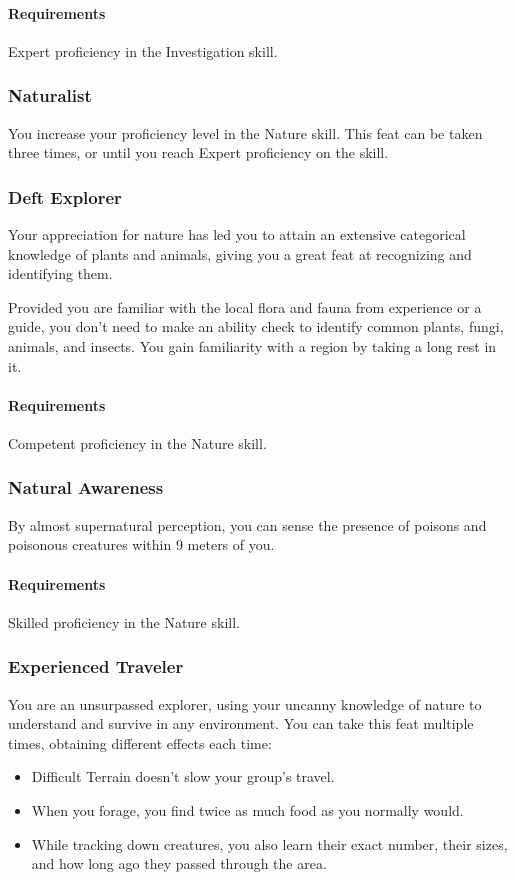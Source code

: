     \paragraph{Requirements} Expert proficiency in the Investigation skill.
\subsubsection{Naturalist} \label{feat::naturalist}
    You increase your proficiency level in the Nature skill.
    This feat can be taken three times, or until you reach Expert proficiency on the skill.
\subsubsection{Deft Explorer} \label{feat::deftexplorer}
    Your appreciation for nature has led you to attain an extensive categorical knowledge of plants and animals, giving you a great feat at recognizing and identifying them.

    Provided you are familiar with the local flora and fauna from experience or a guide, you don't need to make an ability check to identify common plants, fungi, animals, and insects.
    You gain familiarity with a region by taking a long rest in it.
    \paragraph{Requirements} Competent proficiency in the Nature skill.
\subsubsection{Natural Awareness} \label{feat::naturalawareness}
    By almost supernatural perception, you can sense the presence of poisons and poisonous creatures within 9 meters of you.

    \paragraph{Requirements} Skilled proficiency in the Nature skill.
\subsubsection{Experienced Traveler} \label{feat::experiencedtraveler}
    You are an unsurpassed explorer, using your uncanny knowledge of nature to understand and survive in any environment.
    You can take this feat multiple times, obtaining different effects each time:
    \begin{itemize}
        \item Difficult Terrain doesn't slow your group's travel.
        \item When you forage, you find twice as much food as you normally would.
        \item While tracking down creatures, you also learn their exact number, their sizes, and how long ago they passed through the area.
    \end{itemize}
